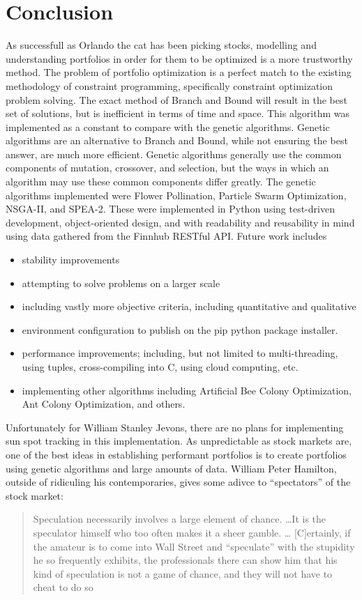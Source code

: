 \documentclass{article}
\begin{document}
    \section{Conclusion}
    As successfull as Orlando the cat has been picking stocks, modelling and understanding portfolios in order for them to be optimized is a more trustworthy 
    method. The problem of portfolio optimization is a perfect match to the existing methodology of constraint programming, specifically constraint optimization 
    problem solving. The exact method of Branch and Bound will result in the best set of solutions, but is inefficient in terms of time and space. This algorithm
    was implemented as a constant to compare with the genetic algorithms. Genetic algorithms are an alternative to Branch and Bound, while not ensuring the best 
    answer, are much more efficient. Genetic algorithms generally use the common components of mutation, crossover, and selection, but the ways in which an 
    algorithm may use these common components differ greatly. The genetic algorithms implemented were Flower Pollination, Particle Swarm Optimization, NSGA-II, 
    and SPEA-2. These were implemented in Python using test-driven development, object-oriented design, and with readability and reusability in mind using data 
    gathered from the Finnhub RESTful API. Future work includes 
    \begin{itemize}
        \item stability improvements
        \item attempting to solve problems on a larger scale
        \item including vastly more objective criteria, including quantitative and qualitative
        \item environment configuration to publish on the pip python package installer.
        \item performance improvements; including, but not limited to multi-threading, using tuples, cross-compiling into C, using cloud computing, etc.
        \item implementing other algorithms including Artificial Bee Colony Optimization, Ant Colony Optimization, and others.
    \end{itemize}
    Unfortunately for William Stanley Jevons, there are no plans for implementing sun spot tracking in this implementation. As unpredictable as
    stock markets are, one of the best ideas in establishing performant portfolios is to create portfolios using genetic algorithms and large 
    amounts of data. William Peter Hamilton, outside of ridiculing his contemporaries, gives some adivce to ``spectators'' of the stock market:
    \begin{quotation}
        Speculation necessarily involves a large element of chance. \ldots It is the speculator himself who too often makes it a sheer gamble. \ldots
        [C]ertainly, if the amateur is to come into Wall Street and ``speculate'' with the stupidity he so frequently exhibits, the professionals there
        can show him that his kind of speculation is not a game of chance, and they will not have to cheat to do so
    \end{quotation}
    \cite{Hamilton}
    \newpage
    \printbibliography
\end{document}
